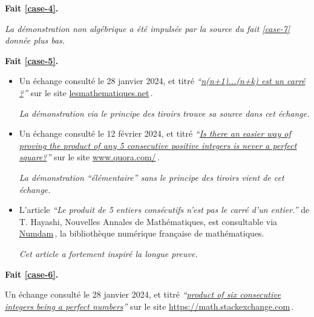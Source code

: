 

\bigskip
\textbf{Fait \ref{case-4}.}
	

\smallskip
\noindent
\emph{La démonstration non algébrique a été impulsée par la source du fait \ref{case-7} donnée plus bas.}




\bigskip
\textbf{Fait \ref{case-5}.}
	
\begin{itemize}
	\item Un échange consulté le 28 janvier 2024, et titré 
	\emph{\enquote{\href{https://les-mathematiques.net/vanilla/discussion/comment/351293}{n(n+1)...(n+k) est un carré ?}}} 
	sur le site \url{lesmathematiques.net}\,.

    \smallskip
    \noindent
    \emph{La démonstration via le principe des tiroirs trouve sa source dans cet échange.}


	\item Un échange consulté le 12 février 2024, et titré 
	\emph{\enquote{\href{https://artisticmathematics.quora.com/Is-there-an-easier-way-of-proving-the-product-of-any-5-consecutive-positive-integers-is-never-a-perfect-square}{Is there an easier way of proving the product of any 5 consecutive positive integers is never a perfect square?}}} 
	sur le site \url{www.quora.com/}\,.

    \smallskip
    \noindent
    \emph{La démonstration \enquote{élémentaire} sans le principe des tiroirs vient de cet échange.}


	\item L'article \emph{\enquote{Le produit de 5 entiers consécutifs n'est pas le carré d'un entier.}} de T. Hayashi, Nouvelles Annales de Mathématiques, est consultable via \href{https://numdam.org}{Numdam}\,, la bibliothèque numérique française de mathématiques.
	
	\smallskip
	\noindent
	\emph{Cet article a fortement inspiré la longue preuve.}
\end{itemize}
\vspace{-1ex}




\bigskip
\textbf{Fait \ref{case-6}.}
	
\smallskip
\noindent
Un échange consulté le 28 janvier 2024, et titré
\emph{\enquote{\href{https://math.stackexchange.com/q/90894/52365}{product of six consecutive integers being a perfect numbers}}} 
sur le site \url{https://math.stackexchange.com}\,.
	
